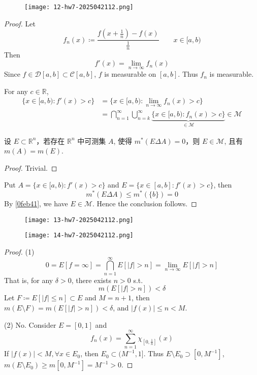 \begin{exercise}
\begin{figure}[H]
\centering
\texttt{[image: 12-hw7-2025042112.png]}
\label{}
\end{figure}
\end{exercise}
\begin{proof}
Let
\[
f_n(x)\coloneqq \frac{f\left( x+\frac{1}{n} \right)-f(x)}{\frac{1}{n}}\qquad x\in[a,b)
\]
Then
\[
f'(x)=\lim_{ n \to \infty } f_n(x)
\]
Since $f\in \mathcal{D}[a,b]\subset \mathcal{C}[a,b]$, $f$ is measurable on $[a,b]$. Thus $f_n$ is measurable.

For any  $c\in \mathbb{R}$,
\[
\begin{aligned}
\{ x\in[a,b):f'(x)>c \} & =\{ x\in[a,b):\lim_{ n \to \infty } f_n(x)>c \} \\
 & =\bigcap_{n=1}^{\infty} \bigcup_{n=k}^{\infty}\underbrace{ \{ x\in[a,b):f_n(x)>c \}  }_{ \in \mathcal{M} } \in \mathcal{M }
\end{aligned}
\]
\begin{lemma}
设 $E\subset \mathbb{R}^{n}$，若存在 $\mathbb{R}^{n}$ 中可测集 $A$, 使得 $m^{*}(E\Delta A)=0$，则 $E\in \mathcal{M}$, 且有 $m(A)=m(E)$.\label{0feb41}
\end{lemma}

\begin{proof}
Trivial.
\end{proof}
Put $A=\{ x\in[a,b):f'(x)>c \}$ and $E=\{ x\in[a,b]:f'(x)>c \}$, then
\[
m^{*}(E\Delta A)\leq m^{*}(\{ b \})=0
\]
By \cref{0feb41}, we have $E\in \mathcal{M}$. Hence the conclusion follows.

\end{proof}

\begin{exercise}
\begin{figure}[H]
\centering
\texttt{[image: 13-hw7-2025042112.png]}
\label{}
\end{figure}
\begin{figure}[H]
\centering
\texttt{[image: 14-hw7-2025042112.png]}
\label{}
\end{figure}
\end{exercise}
\begin{proof}
(1)
\[
0=E[f=\infty]=\bigcap_{n=1}^{\infty} E[\lvert f \rvert > n]=\lim_{ n \to \infty } E[\lvert f \rvert > n]
\]
That is, for any $\delta>0$, there exists $n>0$ s.t.
\[
m(E[\lvert f \rvert > n])<\delta
\]
Let $F\coloneqq E[\lvert f \rvert\leq n]\subset E$ and $M=n+1$, then $m(E\setminus F)=m(E[\lvert f \rvert>n])<\delta$, and $\lvert f(x) \rvert\leq n<M$.

(2) No. Consider $E=[0,1]$ and
\[
f_n(x)=\sum_{n=1}^{\infty} \chi_{\left[ 0,\frac{1}{n} \right]}(x)
\]
If $\lvert f (x) \rvert<M,\forall x\in E_0$, then $E_0\subset(M^{-1},1]$. Thus $E\setminus E_0\supset[0,M^{-1}]$, $m(E\setminus E_0)\geq m[0,M^{-1}]=M^{-1}>0$.
\end{proof}
